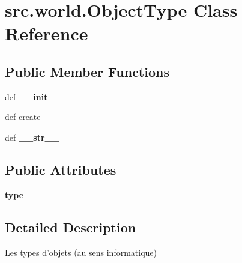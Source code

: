 \hypertarget{classsrc_1_1world_1_1_object_type}{\section{src.\-world.\-Object\-Type \-Class \-Reference}
\label{classsrc_1_1world_1_1_object_type}
}
\subsection*{\-Public \-Member \-Functions}
\begin{DoxyCompactItemize}
\item 
\hypertarget{classsrc_1_1world_1_1_object_type_ac8a8a5e2f760dc7ad47a122c2f81260a}{def {\bfseries \-\_\-\-\_\-init\-\_\-\-\_\-}}\label{classsrc_1_1world_1_1_object_type_ac8a8a5e2f760dc7ad47a122c2f81260a}

\item 
def \hyperlink{classsrc_1_1world_1_1_object_type_ad802e763a2a37cccc20b98e1d6b35fb6}{create}
\item 
\hypertarget{classsrc_1_1world_1_1_object_type_a08d5b8ddd6761e8ac32f5c0bda5f9eae}{def {\bfseries \-\_\-\-\_\-str\-\_\-\-\_\-}}\label{classsrc_1_1world_1_1_object_type_a08d5b8ddd6761e8ac32f5c0bda5f9eae}

\end{DoxyCompactItemize}
\subsection*{\-Public \-Attributes}
\begin{DoxyCompactItemize}
\item 
\hypertarget{classsrc_1_1world_1_1_object_type_a9a72a17c18cf9dcf1e078609ca81aa3a}{{\bfseries type}}\label{classsrc_1_1world_1_1_object_type_a9a72a17c18cf9dcf1e078609ca81aa3a}

\end{DoxyCompactItemize}


\subsection{\-Detailed \-Description}
\begin{DoxyVerb}Les types d'objets (au sens informatique) \end{DoxyVerb}
 

